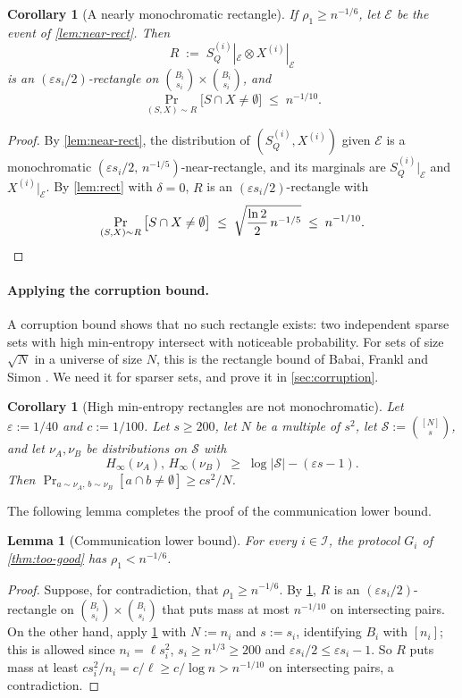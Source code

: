 \documentclass[11pt]{article}
\theoremstyle{plain}
\newtheorem{lemma}[theorem]{Lemma}
\newtheorem{corollary}[theorem]{Corollary}
\theoremstyle{definition}
\theoremstyle{remark}
\newcommand{\eps}{\varepsilon}
\newcommand{\abs}[1]{\left|#1\right|}
\newcommand{\cS}{\mathcal{S}}
\newcommand{\cI}{\mathcal{I}}
\newcommand{\cE}{\mathcal{E}}
\newcommand{\Hmin}{H_\infty}
\begin{document}
\begin{corollary}[A nearly monochromatic rectangle]\label{cor:rect}
If $\rho_1 \ge n^{-1/6}$, let $\cE$ be the event of \cref{lem:near-rect}. Then
\[ R \;:=\; S_Q^{(i)}|_{\cE} \otimes X^{(i)}|_{\cE} \]
is an $(\eps s_i/2)$-rectangle on $\binom{B_i}{s_i} \times \binom{B_i}{s_i}$, and
\[ \Pr_{(S, X) \sim R}\big[S \cap X \ne \emptyset\big] \;\le\; n^{-1/10}. \]
\end{corollary}
\begin{proof}
By \cref{lem:near-rect}, the distribution of $(S_Q^{(i)}, X^{(i)})$ given $\cE$ is a monochromatic $(\eps s_i/2,\, n^{-1/5})$-near-rectangle, and its marginals are $S_Q^{(i)}|_{\cE}$ and $X^{(i)}|_{\cE}$. By \cref{lem:rect} with $\delta = 0$, $R$ is an $(\eps s_i/2)$-rectangle with
\[ \Pr_{(S, X) \sim R}\big[S \cap X \ne \emptyset\big] \;\le\; \sqrt{\frac{\ln 2}{2}\, n^{-1/5}} \;\le\; n^{-1/10}. \qedhere \]
\end{proof}

\paragraph{Applying the corruption bound.}\label{sec:step4}
A corruption bound shows that no such rectangle exists: two independent sparse sets with high min-entropy intersect with noticeable probability. For sets of size $\sqrt N$ in a universe of size $N$, this is the rectangle bound of Babai, Frankl and Simon \cite{babai_complexity_1986}. We need it for sparser sets, and prove it in \cref{sec:corruption}.

\begin{corollary}[High min-entropy rectangles are not monochromatic]\label{cor:product}
Let $\eps := 1/40$ and $c := 1/100$. Let $s \ge 200$, let $N$ be a multiple of $s^2$, let $\cS := \binom{[N]}{s}$, and let $\nu_A, \nu_B$ be distributions on $\cS$ with
\[ \Hmin(\nu_A),\, \Hmin(\nu_B) \;\ge\; \log\abs\cS - (\eps s - 1). \]
Then $\Pr_{a \sim \nu_A,\, b \sim \nu_B}[a \cap b \ne \emptyset] \ge c s^2/N$.
\end{corollary}

\noindent The following lemma completes the proof of the communication lower bound.

\begin{lemma}[Communication lower bound]\label{lem:comm-lb}
For every $i \in \cI$, the protocol $G_i$ of \cref{thm:too-good} has $\rho_1 < n^{-1/6}$.
\end{lemma}
\begin{proof}
Suppose, for contradiction, that $\rho_1 \ge n^{-1/6}$. By \cref{cor:rect}, $R$ is an $(\eps s_i/2)$-rectangle on $\binom{B_i}{s_i} \times \binom{B_i}{s_i}$ that puts mass at most $n^{-1/10}$ on intersecting pairs. On the other hand, apply \cref{cor:product} with $N := n_i$ and $s := s_i$, identifying $B_i$ with $[n_i]$; this is allowed since $n_i = \ell s_i^2$, $s_i \ge n^{1/3} \ge 200$ and $\eps s_i/2 \le \eps s_i - 1$. So $R$ puts mass at least $c s_i^2/n_i = c/\ell \ge c/\log n > n^{-1/10}$ on intersecting pairs, a contradiction.
\end{proof}
\end{document}
